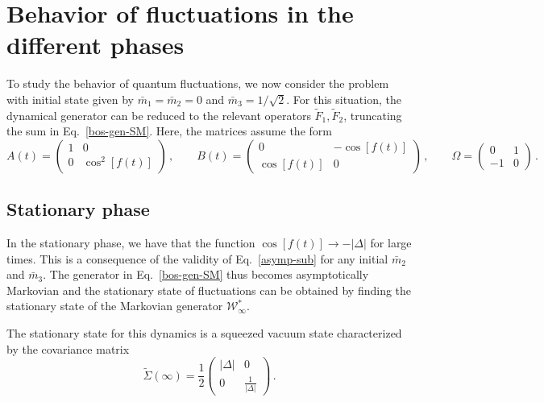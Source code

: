 \documentclass[prl,superscriptaddress,showpacs,longbibliography,reprint]{revtex4-2}
\begin{document}
\section{Behavior of fluctuations in the different phases}
To study the behavior of quantum fluctuations, we now consider the problem with initial state given by $\bar{m}_1=\bar{m}_2=0$ and $\bar{m}_3=1/\sqrt{2}$. For this situation, the dynamical generator can be reduced to the relevant operators $\tilde{F}_1,\tilde{F}_2$, truncating the sum in Eq.~\eqref{bos-gen-SM}. Here, the matrices assume the form 
\begin{equation}
    A(t)=\begin{pmatrix}1&0\\
    0&\cos^2[f(t)]
    \end{pmatrix}\, ,\qquad B(t)=\begin{pmatrix}0&-\cos[f(t)]\\
    \cos[f(t)]&0
    \end{pmatrix}\, ,\qquad \Omega=\begin{pmatrix}0&1\\
    -1&0
    \end{pmatrix}\, .
\end{equation}


\subsection{Stationary phase}
In the stationary phase, we have that the function $\cos[f(t)]\to  -|\Delta|$ for large times. This is a consequence of the validity of Eq.~\eqref{asymp-sub} for any initial $\bar{m}_2$ and $\bar{m}_3$. The generator in Eq.~\eqref{bos-gen-SM} thus becomes asymptotically Markovian and the stationary state of fluctuations can be obtained by finding the stationary state of the Markovian generator $\mathcal{W}_\infty^*$. 

The stationary state for this dynamics is a squeezed vacuum state characterized by the covariance matrix 
$$
\tilde{\Sigma}(\infty)=\frac{1}{2}\begin{pmatrix}|\Delta|&0\\
0&\frac{1}{|\Delta|}
\end{pmatrix}\, .
$$
\end{document}
